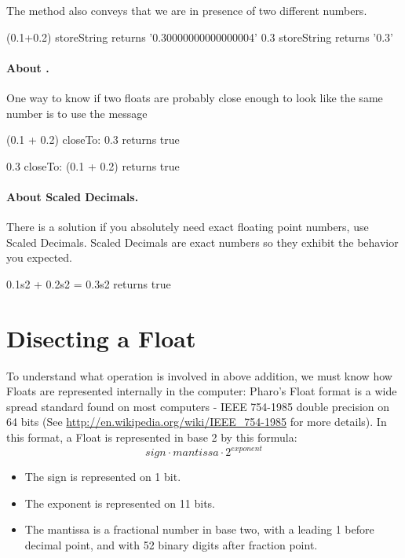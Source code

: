 \documentclass[a4paper,10pt,twoside]{book}
\begin{document}
	
The method  also conveys that we are in presence of two different numbers.
		
\begin{code}{}
(0.1+0.2) storeString 
	returns 	'0.30000000000000004' 
0.3 storeString 
	returns	'0.3'
\end{code}	
		
\paragraph{About .} One way to know if two floats are probably close enough to look like the same number is to use the message 

\begin{code}{}
(0.1 + 0.2) closeTo: 0.3
	returns true

0.3 closeTo: (0.1 + 0.2)
	returns true
\end{code}		
		
		
\paragraph{About Scaled Decimals.} There is a solution if you absolutely need exact floating point numbers, use Scaled Decimals. Scaled Decimals are exact numbers so they exhibit the behavior you expected.

\begin{code}{}
0.1s2 + 0.2s2 = 0.3s2
	returns true
\end{code}		
		

\section{Disecting a Float}
To understand what operation is involved in above addition, we must know how Floats are represented internally in the computer: Pharo's Float format is a wide spread standard found on most computers - IEEE 754-1985 double precision on 64 bits
(See \url{http://en.wikipedia.org/wiki/IEEE_754-1985} for more details).
In this format, a Float is represented in base 2 by this formula: \[ sign \cdot mantissa \cdot 2^{exponent} \]
\begin{itemize}
\item The sign is represented on 1 bit.
\item The exponent is represented on 11 bits.
\item The mantissa is a fractional number in base two, with a leading 1 before decimal point, and with 52 binary digits after fraction point.
\end{itemize}
\end{document}
